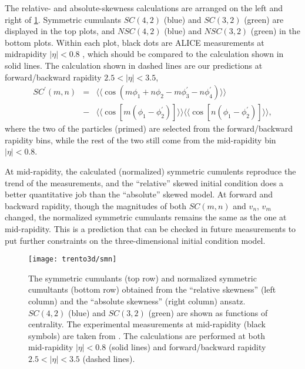 The relative- and absolute-skewness calculations are arranged on the left and right of \ref{fig:trento:smn}. 
Symmetric cumulants $SC(4,2)$ (blue) and $SC(3,2)$ (green) are displayed in the top plots, and $NSC(4,2)$ (blue) and $NSC(3,2)$ (green) in the bottom plots.
Within each plot, black dots are ALICE measurements at midrapidity $|\eta|<0.8$ \cite{ALICE:2016kpq}, which should be compared to the calculation shown in solid lines.
The calculation shown in dashed lines are our predictions at forward/backward rapidity $2.5 < |\eta| < 3.5$,
\begin{eqnarray}
SC^\prime(m, n) &=& \langle\langle \cos(m\phi_1+n\phi_2-m\phi_3^\prime-n\phi_4^\prime)\rangle\rangle \\
\nonumber &-& \langle\langle\cos[m(\phi_1-\phi_2^\prime)]\rangle\rangle\langle\langle\cos[n(\phi_1-\phi_2^\prime)]\rangle\rangle, \label{eq:scmn-diff}
\end{eqnarray}
where the two of the particles (primed) are selected from the forward/backward rapidity bins, while the rest of the two still come from the mid-rapidity bin $|\eta|<0.8$.

At mid-rapidity, the calculated (normalized) symmetric cumulents reproduce the trend of the measurements, and the ``relative'' skewed initial condition does a better quantitative job than the ``absolute'' skewed model.
At forward and backward rapidity, though the magnitudes of both $SC(m,n)$ and $v_n$, $v_m$ changed, the normalized symmetric cumulants remains the same as the one at mid-rapidity.
This is a prediction that can be checked in future measurements to put further constraints on the three-dimensional initial condition model.

\begin{figure}
\singlespacing 
\texttt{[image: trento3d/smn]}
\caption[The symmetric cumulants (top row) and normalized symmetric]{The symmetric cumulants (top row) and normalized symmetric cumultants (bottom row) obtained from the ``relative skewness'' (left column) and the ``absolute skewness'' (right column) ansatz.
$SC(4,2)$ (blue) and $SC(3,2)$ (green) are shown as functions of centrality. The experimental measurements at mid-rapidity (black symbols) are taken from \cite{ALICE:2016kpq}.
The calculations are performed at both mid-rapidity $|\eta|<0.8$ (solid lines) and forward/backward rapidity $2.5<|\eta|<3.5$ (dashed lines).
}
\label{fig:trento:smn} 
\end{figure}

